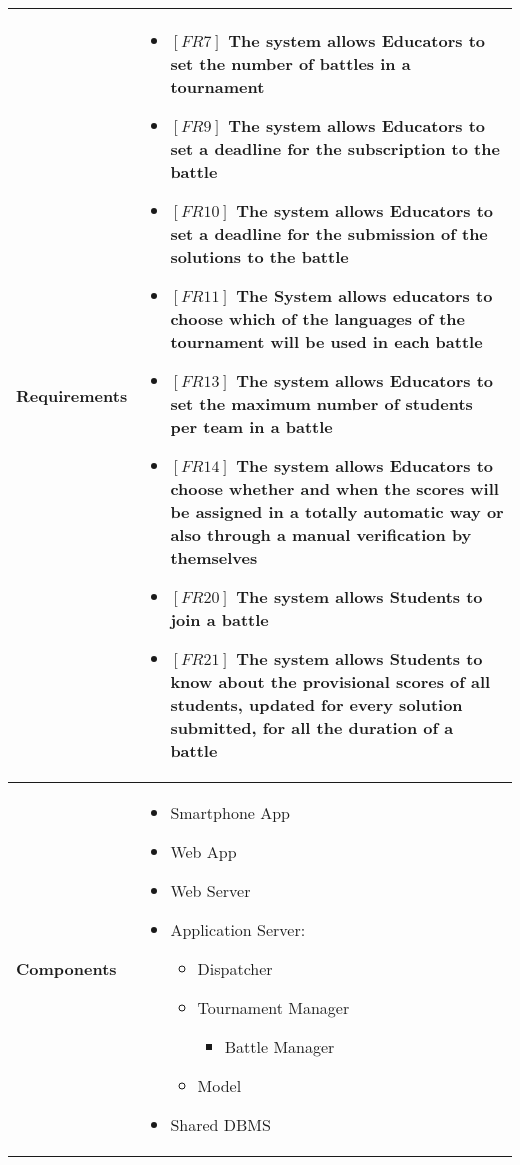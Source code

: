\documentclass{article}
\begin{document}
\begin{table}[H]
 \renewcommand{\arraystretch}{1.5}
    \centering
    \begin{tabular}{|l|p{10cm}|}
        \hline
        \textbf{Requirements} &
        \vspace{-0.6cm}
        \begin{itemize}[label={}, left=0pt, align=left, itemsep=5pt]
            \item $[FR7]$ The system allows Educators to set the number of battles in a tournament
            \item $[FR9]$ The system allows Educators to set a deadline for the subscription to the battle
            \item $[FR10]$ The system allows Educators to set a deadline for the submission of the solutions to the battle
            \item $[FR11]$ The System allows educators to choose which of the languages of the tournament will be used in each battle
            \item $[FR13]$ The system allows Educators to set the maximum number of students per team in a battle
            \item $[FR14]$ The system allows Educators to choose whether and when the scores will be assigned in a totally automatic way or also through a manual verification by themselves
            \item $[FR20]$ The system allows Students to join a battle
            \item $[FR21]$ The system allows Students to know about the provisional scores of all students, updated for every solution submitted, for all the duration of a battle
        \end{itemize} \\
        \hline
        \textbf{Components} & 
        \begin{itemize}[align=left, topsep=0pt, partopsep=0pt]
            \item Smartphone App
            \item Web App
            \item Web Server
            \item Application Server:
            \begin{itemize}
                \item Dispatcher
                \item Tournament Manager
                \begin{itemize}
                    \item Battle Manager
                \end{itemize}
                \item Model
            \end{itemize}
            \item Shared DBMS 
        \end{itemize} \\
        \hline
    \end{tabular}
\end{table}
\end{document}
